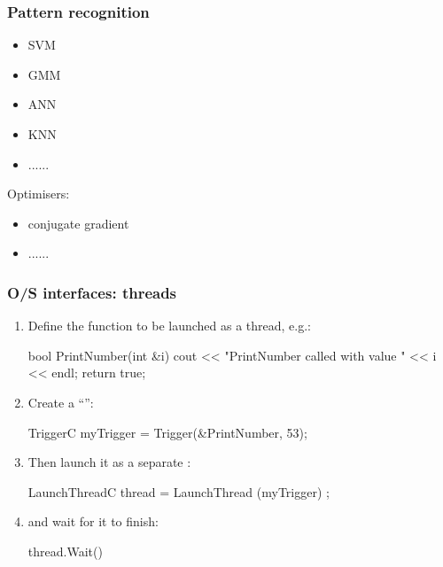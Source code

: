 \documentclass[landscape]{beamer}
\begin{document}
\begin{frame}[fragile]\frametitle{Pattern recognition}


  \begin{itemize}
  \item SVM
  \item GMM
  \item ANN
  \item KNN
  \item ......
  \end{itemize}

Optimisers:

  \begin{itemize}
  \item conjugate gradient
  \item ......
  \end{itemize}

\end{frame}


\begin{frame}[fragile]\frametitle{O/S interfaces: threads}

  \begin{enumerate}
  \item Define the function to be launched as a thread, e.g.:

\begin{Code}
  bool PrintNumber(int &i) {
    cout << "PrintNumber called with value " << i << endl;
    return true;
  }
\end{Code}

  \item Create a ``'': 

\begin{Code}
  TriggerC myTrigger = Trigger(&PrintNumber, 53);
\end{Code}

  \item Then launch it as a separate :

\begin{Code}
  LaunchThreadC thread = LaunchThread (myTrigger) ; 
\end{Code}

\item and wait for it to finish:

\begin{Code}
  thread.Wait()
\end{Code}



\end{enumerate}
\end{frame}
\end{document}
